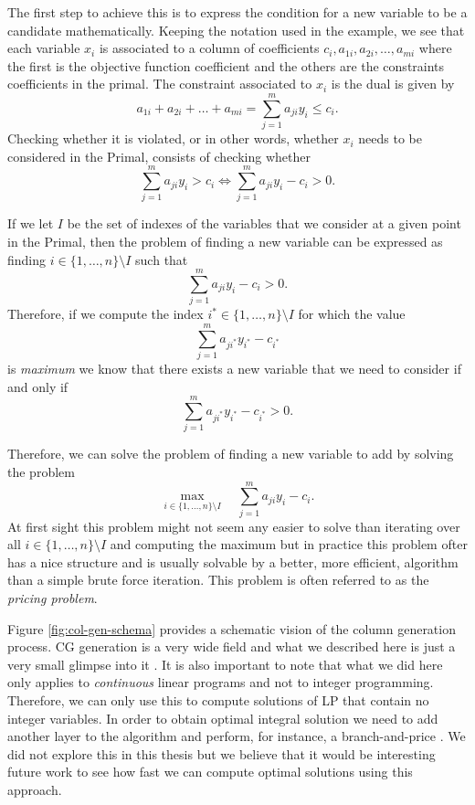 The first step to achieve this is to express the condition for a new variable to be a candidate mathematically. Keeping the notation
used in the example, we see that each variable $x_i$ is associated to a column of coefficients $c_i, a_{1i}, a_{2i}, \ldots, a_{mi}$
where the first is the objective function coefficient and the others are the constraints coefficients in the primal.
The constraint associated to $x_i$ is the dual is given by
$$
a_{1i} + a_{2i} + \ldots + a_{mi} = \sum_{j = 1}^m a_{ji} y_i \leq c_i.
$$
Checking whether it is violated, or in other words, whether $x_i$ needs to be considered in the \textsf{Primal}, consists of 
checking whether
$$
\sum_{j = 1}^m a_{ji} y_i > c_i \Leftrightarrow \sum_{j = 1}^m a_{ji} y_i - c_i > 0.
$$

If we let $I$ be the set of indexes of the variables that we consider at a given point in the \textsf{Primal}, then the problem
of finding a new variable can be expressed as finding $i \in \{ 1, \ldots, n\} \setminus I$ such that
$$
\sum_{j = 1}^m a_{ji} y_i - c_i > 0.
$$
Therefore, if we compute the index $i^* \in \{ 1, \ldots, n\} \setminus I$ for which the value
$$
\sum_{j = 1}^m a_{ji^*} y_{i^*} - c_{i^*}
$$
is \emph{maximum} we know that there exists a new variable that we need to consider if and only if
$$
\sum_{j = 1}^m a_{ji^*} y_{i^*} - c_{i^*} > 0.
$$

Therefore, we can solve the problem of finding a new variable to add by solving the problem
$$
\max_{i \in \{ 1, \ldots, n\} \setminus I} \quad \sum_{j = 1}^m a_{ji} y_{i} - c_{i}.
$$
At first sight this problem might not seem any easier to solve than iterating over all $i \in \{ 1, \ldots, n\} \setminus I$
and computing the maximum but in practice this problem ofter has a nice structure and is usually solvable 
by a better, more efficient, algorithm than a simple brute force iteration. This problem is often referred to as the
\emph{pricing problem}.

Figure \ref{fig:col-gen-schema} provides a schematic vision of the column generation process.
CG generation is a very wide field and what we described here is just a very small glimpse into it \cite{desaulniers2006column}.
It is also important to note that what we did here only applies to \emph{continuous} linear programs and not to integer programming.
Therefore, we can only use this to compute solutions of LP that contain no integer variables. In order to obtain optimal
integral solution we need to add another layer to the algorithm and perform, for instance, a branch-and-price \cite{branchPrice}.
We did not explore this in this thesis but we believe that it would be interesting future work to see how fast we can
compute optimal solutions using this approach. 

